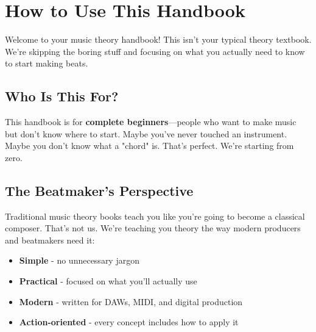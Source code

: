 \documentclass[11pt,letterpaper]{article}
\begin{document}
\newpage


\tableofcontents

\newpage


\section*{How to Use This Handbook}

Welcome to your music theory handbook! This isn't your typical theory textbook. We're skipping the boring stuff and focusing on what you actually need to know to start making beats.

\subsection*{Who Is This For?}

This handbook is for \textbf{complete beginners}—people who want to make music but don't know where to start. Maybe you've never touched an instrument. Maybe you don't know what a "chord" is. That's perfect. We're starting from zero.

\subsection*{The Beatmaker's Perspective}

Traditional music theory books teach you like you're going to become a classical composer. That's not us. We're teaching you theory the way modern producers and beatmakers need it:

\begin{itemize}[leftmargin=*]
\item \textbf{Simple} - no unnecessary jargon
\item \textbf{Practical} - focused on what you'll actually use
\item \textbf{Modern} - written for DAWs, MIDI, and digital production
\item \textbf{Action-oriented} - every concept includes how to apply it
\end{itemize}
\end{document}
